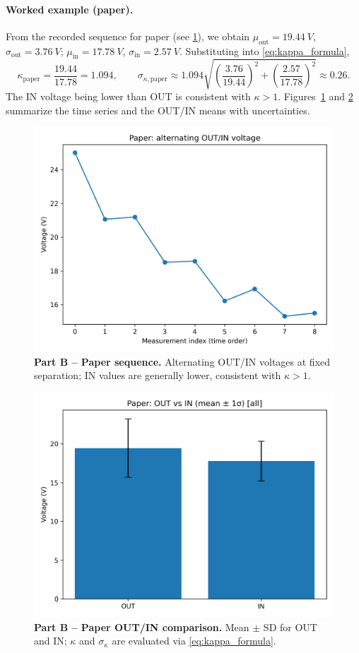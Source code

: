 \documentclass[12pt]{article}
\begin{document}
\paragraph{Worked example (paper).}
From the recorded sequence for paper (see \cref{fig:paper_seq}), we obtain \(\mu_{\text{out}}=\SI{19.44}{V}\), \(\sigma_{\text{out}}=\SI{3.76}{V}\); \(\mu_{\text{in}}=\SI{17.78}{V}\), \(\sigma_{\text{in}}=\SI{2.57}{V}\). Substituting into \cref{eq:kappa_formula},
\begin{equation}
    \kappa_{\text{paper}} = \frac{19.44}{17.78} = 1.094,
    \qquad
    \sigma_{\kappa,\text{paper}}
    \approx 1.094\sqrt{\left(\frac{3.76}{19.44}\right)^2+\left(\frac{2.57}{17.78}\right)^2}
    \approx 0.26.
    \label{eq:paper_calc}
\end{equation}
The IN voltage being lower than OUT is consistent with \(\kappa>1\). Figures~\ref{fig:paper_seq} and \ref{fig:paper_bars} summarize the time series and the OUT/IN means with uncertainties.

\begin{figure}[htbp]
\centering
\includegraphics[width=0.70\linewidth]{PartB_paper.png}
\caption{\textbf{Part B -- Paper sequence.} Alternating OUT/IN voltages at fixed separation; IN values are generally lower, consistent with \(\kappa>1\).}
\label{fig:paper_seq}
\end{figure}

\begin{figure}[htbp]
\centering
\includegraphics[width=0.58\linewidth]{PartB_OUTIN_bars_paper_all.png}
\caption{\textbf{Part B -- Paper OUT/IN comparison.} Mean \(\pm\) SD for OUT and IN; \(\kappa\) and \(\sigma_\kappa\) are evaluated via \cref{eq:kappa_formula}.}
\label{fig:paper_bars}
\end{figure}
\FloatBarrier
\end{document}
